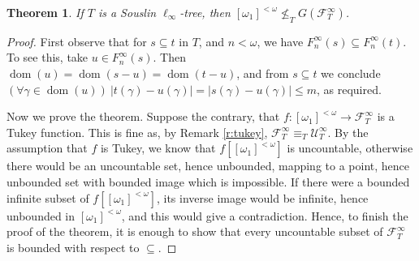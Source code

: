 \documentclass{amsart}
\theoremstyle{plain}
\newtheorem{theorem}{Theorem}[section]
\theoremstyle{definition}
\numberwithin{equation}{section}
\newcommand{\g}{\gamma}
\renewcommand{\o}{\omega}
\newcommand{\sst}{\subseteq}
\newcommand{\cu}{\mathcal U}
\newcommand{\ft}{\mathcal F^{\infty}_T}
\newcommand{\abs}[1]{\left\vert#1\right\vert}
\newcommand{\dom}{\operatorname{dom}}
\begin{document}
\begin{theorem}\label{t:newtype}
	If $T$ is a Souslin $\ell_{\infty}$-tree, then $[\o_1]^{<\o}\not\le_T G(\ft)$.
\end{theorem}
\begin{proof}
	First observe that for $s\sst t$ in $T$, and $n<\o$, we have $F^{\infty}_n(s)\sst F^{\infty}_n(t)$.
	To see this, take $u\in F^{\infty}_n(s)$.
	Then $\dom(u)=\dom(s-u)=\dom(t-u)$, and from $s\sst t$ we conclude $(\forall \g\in\dom(u))\ \abs{t(\g)-u(\g)}=\abs{s(\g)-u(\g)}\le m$, as required.

	Now we prove the theorem.
	Suppose the contrary, that $f:[\o_1]^{<\o}\to \ft$ is a Tukey function.
	This is fine as, by Remark \ref{r:tukey}, $\ft\equiv_T \cu^{\infty}_T$.
	By the assumption that $f$ is Tukey, we know that $f\left[[\o_1]^{<\o}\right]$ is uncountable, otherwise there would be an uncountable set, hence unbounded, mapping to a point, hence unbounded set with bounded image which is impossible.
	If there were a bounded infinite subset of $f\left[[\o_1]^{<\o}\right]$, its inverse image would be infinite, hence unbounded in $[\o_1]^{<\o}$, and this would give a contradiction.
	Hence, to finish the proof of the theorem, it is enough to show that every uncountable subset of $\ft$ is bounded with respect to $\sst$.
	

\end{proof}
\end{document}
